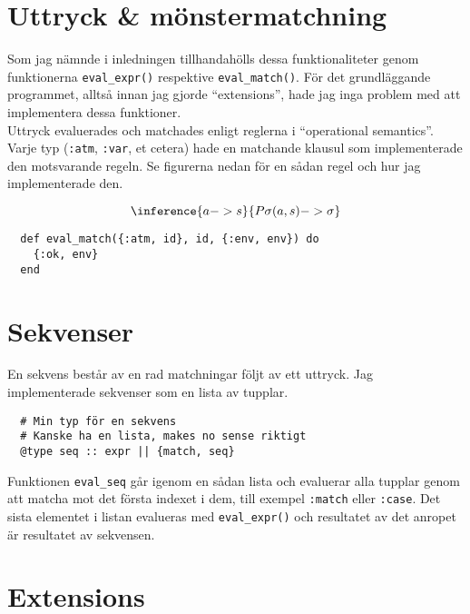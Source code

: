 \documentclass[a4paper,11pt]{article}
\begin{document}
\section*{Uttryck \& mönstermatchning}
Som jag nämnde i inledningen tillhandahölls dessa funktionaliteter genom funktionerna {\tt eval\_expr()} respektive {\tt eval\_match()}. För det grundläggande programmet, alltså innan jag gjorde ``extensions'', hade jag inga problem med att implementera dessa funktioner.\\
Uttryck evaluerades och matchades enligt reglerna i ``operational semantics''. Varje typ ({\tt :atm}, {\tt :var}, et cetera) hade en matchande klausul som implementerade den motsvarande regeln. Se figurerna nedan för en sådan regel och hur jag implementerade den.

\[{\inference {a -> s}{P\sigma(a, s) -> \sigma}}\]
\begin{verbatim}
  def eval_match({:atm, id}, id, {:env, env}) do
    {:ok, env}
  end
\end{verbatim}

\section*{Sekvenser}
En sekvens består av en rad matchningar följt av ett uttryck. Jag implementerade sekvenser som en lista av tupplar.

\begin{verbatim}
  # Min typ för en sekvens
  # Kanske ha en lista, makes no sense riktigt
  @type seq :: expr || {match, seq}
\end{verbatim}

Funktionen {\tt eval\_seq} går igenom en sådan lista och evaluerar alla tupplar genom att matcha mot det första indexet i dem, till exempel {\tt :match} eller {\tt :case}. Det sista elementet i listan evalueras med {\tt eval\_expr()} och resultatet av det anropet är resultatet av sekvensen.

\section*{Extensions}
\end{document}
